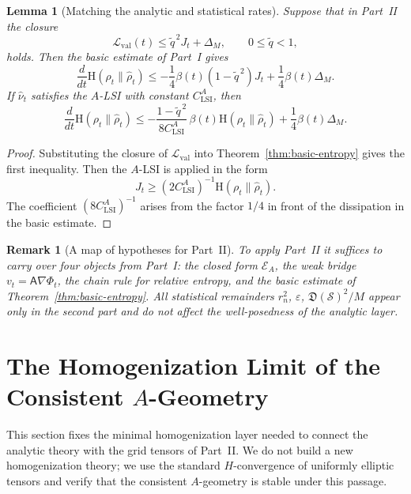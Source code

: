 \documentclass{article}
\newtheorem{lemma}[theorem]{Lemma}
\newtheorem{remark}[theorem]{Remark}
\newcommand{\Ent}{\mathrm H}
\newcommand{\Eval}{\mathcal L_{\mathrm{val}}}
\newcommand{\Asf}{\mathsf A}
\begin{document}
\begin{lemma}[Matching the analytic and statistical rates]
\label{lem:analytic-stat-rate-map}
Suppose that in Part~II the closure
\[
        \Eval(t)\le \widetilde q^{\,2}J_t+\Delta_M,
        \qquad 0\le\widetilde q<1 ,
\]
holds. Then the basic estimate of Part~I gives
\[
        \frac d{dt}\Ent(\rho_t\|\hat\rho_t)
        \le
        -\frac14\beta(t)(1-\widetilde q^{\,2})J_t
        +\frac14\beta(t)\Delta_M .
\]
If \(\hat\nu_t\) satisfies the \(A\)-LSI with constant
\(C_{\mathrm{LSI}}^A\), then
\[
        \frac d{dt}\Ent(\rho_t\|\hat\rho_t)
        \le
        -\frac{1-\widetilde q^{\,2}}{8C_{\mathrm{LSI}}^A}\,
        \beta(t)\Ent(\rho_t\|\hat\rho_t)
        +\frac14\beta(t)\Delta_M .
\]
\end{lemma}

\begin{proof}
Substituting the closure of \(\Eval\) into Theorem~\ref{thm:basic-entropy}
gives the first inequality. Then the \(A\)-LSI is applied in the form
\[
        J_t\ge (2C_{\mathrm{LSI}}^A)^{-1}\Ent(\rho_t\|\hat\rho_t).
\]
The coefficient \((8C_{\mathrm{LSI}}^A)^{-1}\) arises from the factor
\(1/4\) in front of the dissipation in the basic estimate.
\end{proof}

\begin{remark}[A map of hypotheses for Part~II]
To apply Part~II it suffices to carry over four objects from Part~I: the closed form \(\mathcal E_A\), the weak bridge
\(v_t=\Asf\nabla\Phi_t\), the chain rule for relative entropy, and the basic
estimate of Theorem~\ref{thm:basic-entropy}. All statistical remainders
\(r_n^2\), \(\varepsilon\), \(\mathfrak D(\mathcal S)^2/M\) appear only in the
second part and do not affect the well-posedness of the analytic layer.
\end{remark}

\section{The Homogenization Limit of the Consistent \(A\)-Geometry}
\label{sec:homogenization-A-geometry}

This section fixes the minimal homogenization layer needed to connect the
analytic theory with the grid tensors of Part~II. We do not build a
new homogenization theory; we use the standard \(H\)-convergence of uniformly
elliptic tensors \cite{Allaire,CioranescuDonato} and verify that the
consistent \(A\)-geometry is stable under this passage.
\end{document}
